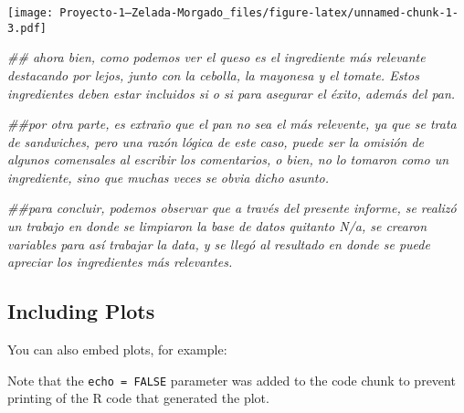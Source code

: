 \documentclass[
]{article}
\newenvironment{Shaded}{\begin{snugshade}}{\end{snugshade}}
\newcommand{\CommentTok}[1]{\textcolor[rgb]{0.56,0.35,0.01}{\textit{#1}}}
\begin{document}
\texttt{[image: Proyecto-1--Zelada-Morgado\_files/figure-latex/unnamed-chunk-1-3.pdf]}

\begin{Shaded}
\begin{Highlighting}[]
\CommentTok{## ahora bien, como podemos ver  el queso es el ingrediente más relevante destacando por lejos, junto con la cebolla, la mayonesa y el tomate. Estos ingredientes deben estar incluidos si o si para asegurar el éxito, además del pan. }

\CommentTok{##por otra parte, es extraño que el pan no sea el más relevente, ya que se trata de sandwiches, pero una razón lógica de este caso, puede ser la omisión de algunos comensales al escribir los comentarios, o bien, no lo tomaron como un ingrediente, sino que muchas veces se obvia dicho asunto.}


\CommentTok{##para concluir, podemos observar que a través del presente informe, se realizó un trabajo en donde se limpiaron la base de datos quitanto N/a, se crearon variables para así trabajar la data, y se llegó al resultado en donde se puede apreciar los ingredientes más relevantes.}
\end{Highlighting}
\end{Shaded}

\hypertarget{including-plots}{%
\subsection{Including Plots}\label{including-plots}}

You can also embed plots, for example:

Note that the \texttt{echo\ =\ FALSE} parameter was added to the code
chunk to prevent printing of the R code that generated the plot.
\end{document}
